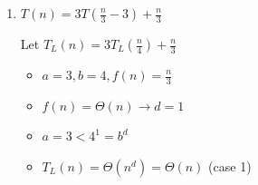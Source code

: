 \documentclass[11pt, a4paper, oneside]{memoir}
\begin{document}
\begin{enumerate}
    Well, actually we can also derive an asymptotically tight bound for $T(n)$ by substitution and unrolling the recurrence:
    \begin{align*}
        T(n) &= 5T(n/4) + n(\log n)^2 \\
        n &\mapsto 4^k \\
        T(4^k) &= 5T(4^{k-1}) + 4^k(\log 4^k)^2 \\
        &= 5T(4^{k-1}) + 4^{k}(2k)^2 \\
        \frac{T(4^k)}{4^k} &= \frac{5}{4}\frac{T(4^{k-1})}{4^{k-1}} + (2k)^2 \\
        S(k) &:= \frac{T(4^k)}{4^k} \\
        S(k) &= \frac{5}{4}S(k-1) + (2k)^2 \\
        &= (\frac{5}{4})^k S(0) + \sum_{i=1}^{k} (\frac{5}{4})^{k-i} (2i)^2 \\
        &= (\frac{5}{4})^k T(1) + 4(\frac{5}{4})^k \sum_{i=1}^{k} (\frac{4}{5})^{i} i^2
        \displaybreak[4] \\
        0<x<1 \rightarrow \sum_{i=1}^{\infty} x^{i} i^2 = \frac{x(1+x)}{(1-x)^3} &\rightarrow 0 < \sum_{i=1}^{k} (\frac{4}{5})^{i} i^2 < \frac{\frac{4}{5}(1+\frac{4}{5})}{(1-\frac{4}{5})^3} = 180 \\
        \rightarrow S(k) &= (\frac{5}{4})^k [T(1) + 4\sum_{i=1}^{k} (\frac{4}{5})^{i} i^2] = \Theta((\frac{5}{4})^k) \\
        T(n) &= n S(\frac{\log n}{2}) = \Theta(n(\frac{5}{4})^{\frac{\log n}{2}}) = \Theta(n(\frac{\sqrt{5}}{2})^{\log n})
    \end{align*}

    \item \textbf{$T(n) = 3T(\frac{n}{3}-3) + \frac{n}{3}$}

    Let $T_L(n) = 3T_L(\frac{n}{4}) + \frac{n}{3}$\footnotemark
    \begin{itemize}
        \item $a = 3, b = 4, f(n) = \frac{n}{3}$
        \item $f(n) = \Theta(n) \rightarrow d = 1$
        \item $a = 3 < 4^1 = b^d$
        \item $T_L(n) = \Theta(n^d) = \Theta(n)$ (case 1)
    \end{itemize}


\end{enumerate}
\end{document}
